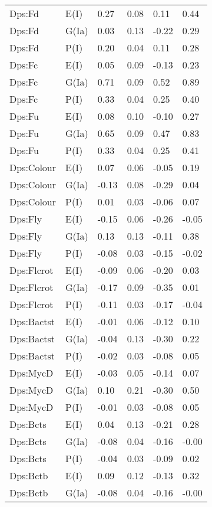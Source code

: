 \begin{center}
\begin{longtable}{|p{1.1in}|p{0.7in}|p{0.7in}|p{0.6in}|p{0.6in}|p{0.6in}|}
  Dps:Fd & E(I) & 0.27 & 0.08 & 0.11 & 0.44 \\ 
  Dps:Fd & G(Ia) & 0.03 & 0.13 & -0.22 & 0.29 \\ 
  Dps:Fd & P(I) & 0.20 & 0.04 & 0.11 & 0.28 \\ 
  Dps:Fc & E(I) & 0.05 & 0.09 & -0.13 & 0.23 \\ 
  Dps:Fc & G(Ia) & 0.71 & 0.09 & 0.52 & 0.89 \\ 
  Dps:Fc & P(I) & 0.33 & 0.04 & 0.25 & 0.40 \\ 
  Dps:Fu & E(I) & 0.08 & 0.10 & -0.10 & 0.27 \\ 
  Dps:Fu & G(Ia) & 0.65 & 0.09 & 0.47 & 0.83 \\ 
  Dps:Fu & P(I) & 0.33 & 0.04 & 0.25 & 0.41 \\ 
  Dps:Colour & E(I) & 0.07 & 0.06 & -0.05 & 0.19 \\ 
  Dps:Colour & G(Ia) & -0.13 & 0.08 & -0.29 & 0.04 \\ 
  Dps:Colour & P(I) & 0.01 & 0.03 & -0.06 & 0.07 \\ 
  Dps:Fly & E(I) & -0.15 & 0.06 & -0.26 & -0.05 \\ 
  Dps:Fly & G(Ia) & 0.13 & 0.13 & -0.11 & 0.38 \\ 
  Dps:Fly & P(I) & -0.08 & 0.03 & -0.15 & -0.02 \\ 
  Dps:Flcrot & E(I) & -0.09 & 0.06 & -0.20 & 0.03 \\ 
  Dps:Flcrot & G(Ia) & -0.17 & 0.09 & -0.35 & 0.01 \\ 
  Dps:Flcrot & P(I) & -0.11 & 0.03 & -0.17 & -0.04 \\ 
  Dps:Bactst & E(I) & -0.01 & 0.06 & -0.12 & 0.10 \\ 
  Dps:Bactst & G(Ia) & -0.04 & 0.13 & -0.30 & 0.22 \\ 
  Dps:Bactst & P(I) & -0.02 & 0.03 & -0.08 & 0.05 \\ 
  Dps:MycD & E(I) & -0.03 & 0.05 & -0.14 & 0.07 \\ 
  Dps:MycD & G(Ia) & 0.10 & 0.21 & -0.30 & 0.50 \\ 
  Dps:MycD & P(I) & -0.01 & 0.03 & -0.08 & 0.05 \\ 
  Dps:Bcts & E(I) & 0.04 & 0.13 & -0.21 & 0.28 \\ 
  Dps:Bcts & G(Ia) & -0.08 & 0.04 & -0.16 & -0.00 \\ 
  Dps:Bcts & P(I) & -0.04 & 0.03 & -0.09 & 0.02 \\ 
  Dps:Bctb & E(I) & 0.09 & 0.12 & -0.13 & 0.32 \\ 
  Dps:Bctb & G(Ia) & -0.08 & 0.04 & -0.16 & -0.00 \\ 

\end{longtable}
\end{center}
